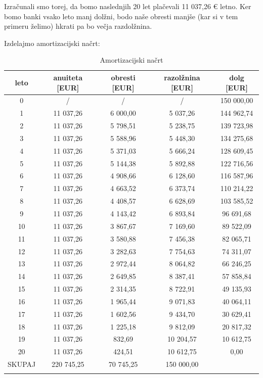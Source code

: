 \documentclass[12pt]{article}
\begin{document}
    Izračunali smo torej, da bomo naslednjih 20 let plačevali 11 037,26 € letno. Ker bomo
    banki vsako leto manj dolžni, bodo naše obresti manjše (kar si v tem primeru želimo)
    hkrati pa bo večja razdolžnina. 
    
    Izdelajmo amortizacijski načrt:
    \begin{longtable}{|c|c|c|c|c|}
        \hline
        \textbf{leto}   & \textbf{anuiteta [EUR]}  & \textbf{obresti [EUR]}  & \textbf{razolžnina [EUR]} & \textbf{dolg [EUR]} \\ \hline
        \endfirsthead
        \endhead
        0      & /          & /         & /          & 150 000,00 \\ \hline
        1      & 11 037,26  & 6 000,00  & 5 037,26   & 144 962,74 \\ \hline
        2      & 11 037,26  & 5 798,51  & 5 238,75   & 139 723,98 \\ \hline
        3      & 11 037,26  & 5 588,96  & 5 448,30   & 134 275,68 \\ \hline
        4      & 11 037,26  & 5 371,03  & 5 666,24   & 128 609,45 \\ \hline
        5      & 11 037,26  & 5 144,38  & 5 892,88   & 122 716,56 \\ \hline \hline 
        6      & 11 037,26  & 4 908,66  & 6 128,60   & 116 587,96 \\ \hline
        7      & 11 037,26  & 4 663,52  & 6 373,74   & 110 214,22 \\ \hline
        8      & 11 037,26  & 4 408,57  & 6 628,69   & 103 585,52 \\ \hline
        9      & 11 037,26  & 4 143,42  & 6 893,84   & 96 691,68  \\ \hline 
        10     & 11 037,26  & 3 867,67  & 7 169,60   & 89 522,09  \\ \hline \hline
        11     & 11 037,26  & 3 580,88  & 7 456,38   & 82 065,71  \\ \hline
        12     & 11 037,26  & 3 282,63  & 7 754,63   & 74 311,07  \\ \hline
        13     & 11 037,26  & 2 972,44  & 8 064,82   & 66 246,25  \\ \hline
        14     & 11 037,26  & 2 649,85  & 8 387,41   & 57 858,84  \\ \hline
        15     & 11 037,26  & 2 314,35  & 8 722,91   & 49 135,93  \\ \hline \hline
        16     & 11 037,26  & 1 965,44  & 9 071,83   & 40 064,11  \\ \hline
        17     & 11 037,26  & 1 602,56  & 9 434,70   & 30 629,41  \\ \hline
        18     & 11 037,26  & 1 225,18  & 9 812,09   & 20 817,32  \\ \hline
        19     & 11 037,26  & 832,69    & 10 204,57  & 10 612,75  \\ \hline
        20     & 11 037,26  & 424,51    & 10 612,75  & 0,00       \\ \hline \hline
        SKUPAJ & 220 745,25 & 70 745,25 & 150 000,00 &            \\ \hline
        \caption{Amortizacijski načrt}
    \end{longtable}
\end{document}
